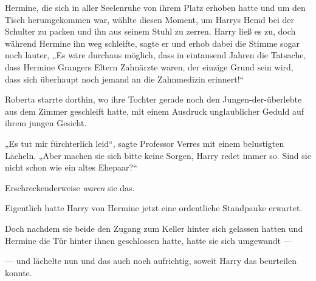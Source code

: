 Hermine, die sich in aller Seelenruhe von ihrem Platz erhoben hatte und um den Tisch herumgekommen war, wählte diesen Moment, um Harrys Hemd bei der Schulter zu packen und ihn aus seinem Stuhl zu zerren. Harry ließ es zu, doch während Hermine ihn weg schleifte, sagte er und erhob dabei die Stimme sogar noch lauter,
„Es wäre durchaus möglich, dass in eintausend Jahren die Tatsache, dass Hermine Grangers Eltern Zahnärzte waren, der einzige Grund sein wird, dass sich überhaupt noch jemand an die Zahnmedizin erinnert!“

\later

Roberta starrte dorthin, wo ihre Tochter gerade noch den Jungen-der-überlebte aus dem Zimmer geschleift hatte, mit einem Ausdruck unglaublicher Geduld auf ihrem jungen Gesicht.

„Es tut mir fürchterlich leid“, sagte Professor Verres mit einem belustigten Lächeln.
„Aber machen sie sich bitte keine Sorgen, Harry redet immer so. Sind sie nicht schon wie ein altes Ehepaar?“

Erschreckenderweise \emph{waren} sie das.

\later

Eigentlich hatte Harry von Hermine jetzt eine ordentliche Standpauke erwartet.

Doch nachdem sie beide den Zugang zum Keller hinter sich gelassen hatten und Hermine die Tür hinter ihnen geschlossen hatte, hatte sie sich umgewandt —

— und lächelte nun und das auch noch aufrichtig, soweit Harry das beurteilen konnte.


